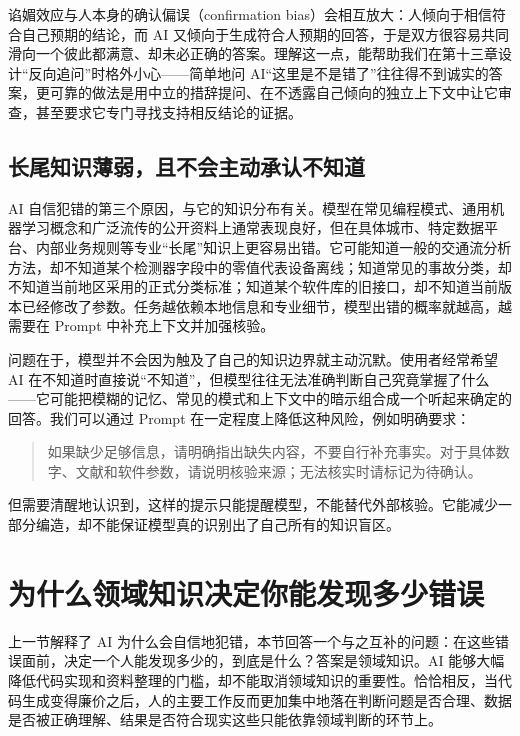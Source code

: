谄媚效应与人本身的确认偏误（confirmation bias）会相互放大：人倾向于相信符合自己预期的结论，而 AI 又倾向于生成符合人预期的回答，于是双方很容易共同滑向一个彼此都满意、却未必正确的答案。理解这一点，能帮助我们在第十三章设计“反向追问”时格外小心——简单地问 AI“这里是不是错了”往往得不到诚实的答案，更可靠的做法是用中立的措辞提问、在不透露自己倾向的独立上下文中让它审查，甚至要求它专门寻找支持相反结论的证据。

\subsection{长尾知识薄弱，且不会主动承认不知道}

AI 自信犯错的第三个原因，与它的知识分布有关。模型在常见编程模式、通用机器学习概念和广泛流传的公开资料上通常表现良好，但在具体城市、特定数据平台、内部业务规则等专业“长尾”知识上更容易出错。它可能知道一般的交通流分析方法，却不知道某个检测器字段中的零值代表设备离线；知道常见的事故分类，却不知道当前地区采用的正式分类标准；知道某个软件库的旧接口，却不知道当前版本已经修改了参数。任务越依赖本地信息和专业细节，模型出错的概率就越高，越需要在 Prompt 中补充上下文并加强核验。

问题在于，模型并不会因为触及了自己的知识边界就主动沉默。使用者经常希望 AI 在不知道时直接说“不知道”，但模型往往无法准确判断自己究竟掌握了什么——它可能把模糊的记忆、常见的模式和上下文中的暗示组合成一个听起来确定的回答。我们可以通过 Prompt 在一定程度上降低这种风险，例如明确要求：

\begin{quote}
如果缺少足够信息，请明确指出缺失内容，不要自行补充事实。对于具体数字、文献和软件参数，请说明核验来源；无法核实时请标记为待确认。
\end{quote}

但需要清醒地认识到，这样的提示只能提醒模型，不能替代外部核验。它能减少一部分编造，却不能保证模型真的识别出了自己所有的知识盲区。

\section{为什么领域知识决定你能发现多少错误}

上一节解释了 AI 为什么会自信地犯错，本节回答一个与之互补的问题：在这些错误面前，决定一个人能发现多少的，到底是什么？答案是领域知识。AI 能够大幅降低代码实现和资料整理的门槛，却不能取消领域知识的重要性。恰恰相反，当代码生成变得廉价之后，人的主要工作反而更加集中地落在判断问题是否合理、数据是否被正确理解、结果是否符合现实这些只能依靠领域判断的环节上。

